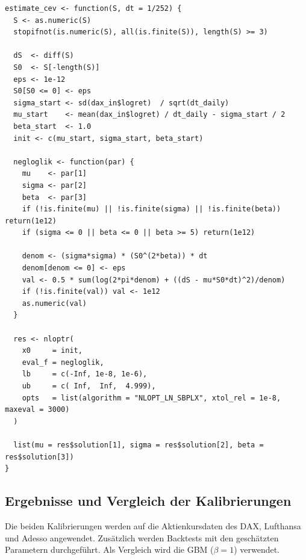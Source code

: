 \begin{lstlisting}
estimate_cev <- function(S, dt = 1/252) {
  S <- as.numeric(S)
  stopifnot(is.numeric(S), all(is.finite(S)), length(S) >= 3)
  
  dS  <- diff(S)
  S0  <- S[-length(S)]
  eps <- 1e-12
  S0[S0 <= 0] <- eps
  sigma_start <- sd(dax_in$logret)  / sqrt(dt_daily)
  mu_start    <- mean(dax_in$logret) / dt_daily - sigma_start / 2
  beta_start  <- 1.0
  init <- c(mu_start, sigma_start, beta_start) 
  
  negloglik <- function(par) {
    mu    <- par[1]
    sigma <- par[2]
    beta  <- par[3]
    if (!is.finite(mu) || !is.finite(sigma) || !is.finite(beta)) return(1e12)
    if (sigma <= 0 || beta <= 0 || beta >= 5) return(1e12)
    
    denom <- (sigma*sigma) * (S0^(2*beta)) * dt
    denom[denom <= 0] <- eps
    val <- 0.5 * sum(log(2*pi*denom) + ((dS - mu*S0*dt)^2)/denom)
    if (!is.finite(val)) val <- 1e12
    as.numeric(val)
  }
  
  res <- nloptr(
    x0     = init,
    eval_f = negloglik,
    lb     = c(-Inf, 1e-8, 1e-6),
    ub     = c( Inf,  Inf,  4.999),
    opts   = list(algorithm = "NLOPT_LN_SBPLX", xtol_rel = 1e-8, maxeval = 3000)
  )
  
  list(mu = res$solution[1], sigma = res$solution[2], beta = res$solution[3])
}
\end{lstlisting}

\subsection{Ergebnisse und Vergleich der Kalibrierungen}

Die beiden Kalibrierungen werden auf die Aktienkursdaten des DAX, Lufthansa und Adesso angewendet. Zusätzlich werden
Backtests mit den geschätzten Parametern durchgeführt. Als Vergleich wird die GBM ($\beta=1$) verwendet.
